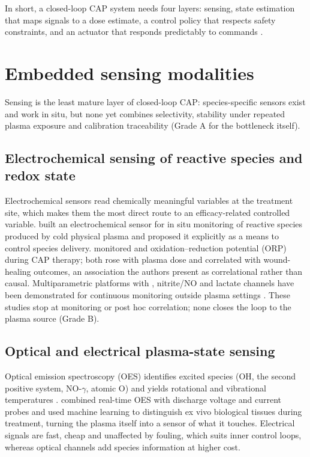 \documentclass[preprint,review,12pt,authoryear]{elsarticle}
\begin{document}
In short, a closed-loop CAP system needs four layers: sensing, state estimation that maps signals to a dose estimate, a control policy that respects safety constraints, and an actuator that responds predictably to commands \citep{bonzanini2022}.

\section{Embedded sensing modalities}
\label{sec:sensing}

Sensing is the least mature layer of closed-loop CAP: species-specific sensors exist and work in situ, but none yet combines selectivity, stability under repeated plasma exposure and calibration traceability (Grade A for the bottleneck itself).

\subsection{Electrochemical sensing of reactive species and redox state}

Electrochemical sensors read chemically meaningful variables at the treatment site, which makes them the most direct route to an efficacy-related controlled variable. \citet{nasri2021} built an electrochemical sensor for in situ monitoring of reactive species produced by cold physical plasma and proposed it explicitly as a means to control species delivery. \citet{thomas2026a} monitored  and oxidation--reduction potential (ORP) during CAP therapy; both rose with plasma dose and correlated with wound-healing outcomes, an association the authors present as correlational rather than causal. Multiparametric platforms with , nitrite/NO and lactate channels have been demonstrated for continuous monitoring outside plasma settings \citep{chmayssem2021}. These studies stop at monitoring or post hoc correlation; none closes the loop to the plasma source (Grade B).

\subsection{Optical and electrical plasma-state sensing}

Optical emission spectroscopy (OES) identifies excited species (OH, the  second positive system, NO-$\gamma$, atomic O) and yields rotational and vibrational temperatures \citep{machala2007}. \citet{chan2025} combined real-time OES with discharge voltage and current probes and used machine learning to distinguish ex vivo biological tissues during treatment, turning the plasma itself into a sensor of what it touches. Electrical signals are fast, cheap and unaffected by fouling, which suits inner control loops, whereas optical channels add species information at higher cost.
\end{document}
